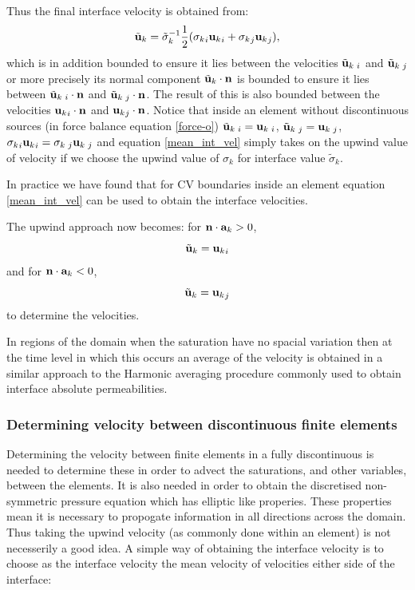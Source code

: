 Thus the final interface velocity is obtained from:
\begin{equation}
{\tilde{\bf u}_k} = {\tilde\sigma_k}^{-1}  \frac{1}{2} ( {\sigma_k}_i {{\bf u}_k}_i + {\sigma_k}_j {{\bf u}_k}_j ), 
\label{mean_int_vel}  
\end{equation} 
which is in addition bounded to ensure it lies between the velocities ${\tilde{\bf u}_k}\:_i$ and ${\tilde{\bf u}_k}\:_j$ 
or more precisely its normal component ${\tilde{\bf u}_k}\cdot {\bf n}$ is bounded to ensure it lies between 
${\tilde{\bf u}_k}\:_i\cdot {\bf n}$ and ${\tilde{\bf{u}}_k}\:_j\cdot {\bf n}$. 
The result of this is also bounded between the velocities 
${{\bf u}_k}_i\cdot {\bf n}$ and ${{\bf u}_k}_j\cdot {\bf n}$. 
Notice that inside an element without discontinuous sources (in force balance equation \ref{force-o}) ${\tilde{\bf u}_k}\:_i={{\bf u}_k}\:_i$, ${\tilde{\bf u}_k}\:_j={{\bf u}_k}\:_j$, 
${\sigma_k}_i {{\bf u}_k}_i = {\sigma_k}\:_j {{\bf u}_k}\:_j $ and 
equation \ref{mean_int_vel} simply takes on the upwind value of velocity if we choose the upwind value of $\sigma_k$ for 
interface value $\tilde\sigma_k$.

In practice we have found that for CV boundaries inside an element equation \ref{mean_int_vel} 
can be used to obtain the interface velocities. 

The upwind approach now becomes: 
for ${\bf n}\cdot {\bf a}_k>0$, 
\begin{equation}
{\tilde{\bf u}_k} ={{\bf u}_k}_i 
\end{equation} 
and for ${\bf n}\cdot {\bf a}_k<0$,
\begin{equation}
{\tilde{\bf u}_k} ={{\bf u}_k}_j 
\end{equation} 
to determine the velocities. 

In regions of the domain when the saturation have 
no spacial variation then at the time level in which this occurs an average of the velocity 
is obtained in a similar approach to the Harmonic averaging procedure commonly used to 
obtain interface absolute permeabilities. 


\subsubsection{Determining velocity between discontinuous finite elements} 

Determining the velocity between finite elements in a fully discontinuous is needed 
 to determine these in order to advect the saturations, and other variables, 
between the elements. It is also needed in order to obtain the discretised 
non-symmetric pressure equation which has elliptic like properies. These properties 
mean it is necessary to propogate information in all directions across the domain. 
Thus taking the upwind velocity (as commonly done within an element) is not necesserily 
a good idea. 
A simple way of obtaining the interface velocity is to choose as the interface velocity the mean 
velocity of velocities either side of the interface: 


